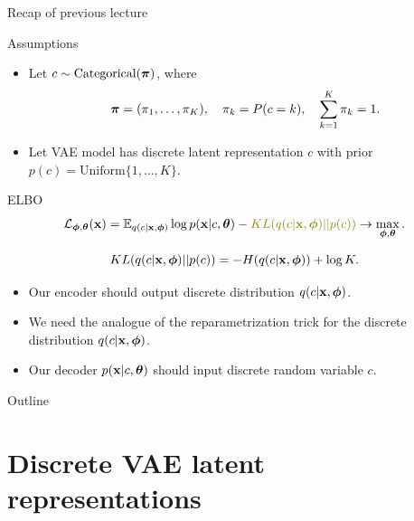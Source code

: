 \begin{frame}{Recap of previous lecture}
	\begin{block}{Assumptions}
		\begin{itemize}
			\item Let $c \sim \text{Categorical}(\boldsymbol{\pi})$, where 
			\vspace{-0.6cm}
			\[
			\boldsymbol{\pi} = (\pi_1, \dots, \pi_K), \quad \pi_k = P(c = k), \quad \sum_{k=1}^K \pi_k = 1.
			\]
			\vspace{-0.7cm}
			\item Let VAE model has discrete latent representation $c$ with prior $p(c) = \text{Uniform}\{1, \dots, K\}$.
		\end{itemize}
	\end{block}
	\begin{block}{ELBO}
		\vspace{-0.6cm}
		\[
			\cL_{\bphi, \btheta}(\bx)  = \mathbb{E}_{q(c | \bx, \bphi)} \log p(\bx | c, \btheta) - {\color{olive} KL(q(c| \bx, \bphi) || p(c))} \rightarrow \max_{\bphi, \btheta}.
		\]
	\end{block}
	\vspace{-1.0cm}
	\[
		KL(q(c| \mathbf{x}, \boldsymbol{\phi}) || p(c)) = - H(q(c | \mathbf{x}, \boldsymbol{\phi})) + \log K. 
	\]		
	\vspace{-0.5cm}
	\begin{itemize}
		\item Our encoder should output discrete distribution $q(c | \mathbf{x}, \boldsymbol{\phi})$.
		\item We need the analogue of the reparametrization trick for the discrete distribution $q(c | \mathbf{x}, \boldsymbol{\phi})$.
		\item Our decoder $p(\mathbf{x} | c, \boldsymbol{\theta})$ should input discrete random variable $c$.
	\end{itemize}
\end{frame}
\begin{frame}{Outline}
	\tableofcontents
\end{frame}
\section{Discrete VAE latent representations}
